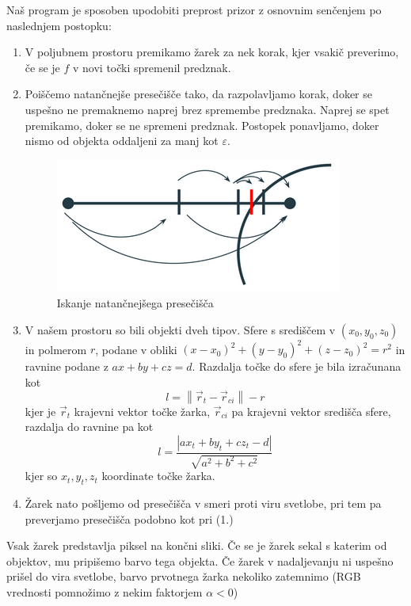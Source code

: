\documentclass[titlepage]{article}
\begin{document}
Naš program je sposoben upodobiti preprost prizor z osnovnim senčenjem po naslednjem postopku:
\newline
\bigskip
\begin{enumerate}
\item V poljubnem prostoru premikamo žarek za nek korak, kjer vsakič preverimo, če se je $f$ v novi točki spremenil predznak.
\item Poiščemo natančnejše presečišče tako, da razpolavljamo korak, doker se uspešno ne premaknemo naprej brez spremembe predznaka. Naprej se spet premikamo, doker se ne spremeni predznak. Postopek ponavljamo, doker nismo od objekta oddaljeni za manj kot $\varepsilon$.
\begin{figure}[H]
    \centering
    \includegraphics[width=0.5\linewidth]{intersect.png}
    \caption{Iskanje natančnejšega presečišča}
    \label{Slika:Iskanje natančnejšega presečišča}
\end{figure}
\item[] V našem prostoru so bili objekti dveh tipov. Sfere s središčem v $(x_{0}, y_{0}, z_{0})$ in polmerom $r$, podane v obliki $(x-x_{0})^{2}+(y-y_{0})^{2}+(z-z_{0})^{2}=r^{2}$ in ravnine podane z $ax+by+cz=d$. Razdalja točke do sfere je bila izračunana kot
\begin{equation} \label{e:distSphere}
    l=\left \| \vec{r}_{t}-\vec{r}_{ci} \right \| - r
\end{equation}
kjer je $\vec{r}_{t}$ krajevni vektor točke žarka, $\vec{r}_{ci}$ pa krajevni vektor središča sfere, razdalja do ravnine pa kot
\begin{equation} \label{e:distPlane}
    l=\frac{\left | ax_{t}+by_{t}+cz_{t}-d \right |}{\sqrt{a^{2}+b^{2}+c^{2}}}
\end{equation}
kjer so $x_{t}, y_{t}, z_{t}$ koordinate točke žarka.
\item Žarek nato pošljemo od presečišča v smeri proti viru svetlobe, pri tem pa preverjamo presečišča podobno kot pri (1.)
\end{enumerate}
Vsak žarek predstavlja piksel na končni sliki. Če se je žarek sekal s katerim od objektov, mu pripišemo barvo tega objekta. Če žarek v nadaljevanju ni uspešno prišel do vira svetlobe, barvo prvotnega žarka nekoliko zatemnimo (RGB vrednosti pomnožimo z nekim faktorjem $\alpha < 0$)
\end{document}
